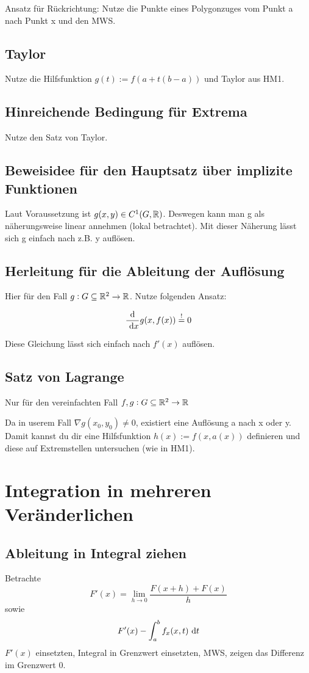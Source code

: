 Ansatz für Rückrichtung: Nutze die Punkte eines Polygonzuges vom Punkt a nach
Punkt x und den MWS.

\subsection{Taylor}
Nutze die Hilfsfunktion $g(t):=f(a+t(b-a))$ und Taylor aus HM1.

\subsection{Hinreichende Bedingung für Extrema}
Nutze den Satz von Taylor.

\subsection{Beweisidee für den Hauptsatz über implizite Funktionen}
Laut Voraussetzung ist $g(x,y) \in C^1(G,\mathbb{R})$. Deswegen kann man g als näherungsweise
linear annehmen (lokal betrachtet). Mit dieser Näherung lässt sich g einfach nach
z.B. y auflösen.

\subsection{Herleitung für die Ableitung der Auflösung}
Hier für den Fall $g:G\subseteq \mathbb{R}^{2} \rightarrow \mathbb{R}$. Nutze folgenden Ansatz:

\begin{equation*}
    \frac{\text{d}}{\text{ d}x}g(x,f(x)) \stackrel{!}{=} 0
\end{equation*}

Diese Gleichung lässt sich einfach nach $f'(x)$ auflösen.

\subsection{Satz von Lagrange}
Nur für den vereinfachten Fall $f,g:G \subseteq \mathbb{R}^{2} \rightarrow \mathbb{R}$

Da in userem Fall $\nabla g(x_0,y_0) \neq 0$, existiert eine Auflösung a nach x oder
y. Damit kannst du dir eine Hilfsfunktion $h(x):=f(x,a(x))$ definieren und diese
auf Extremstellen untersuchen (wie in HM1).


 \section{Integration in mehreren Veränderlichen}
 \subsection{Ableitung in Integral ziehen}
 Betrachte
 \begin{equation*}
     F'(x) = \lim_{h \to 0} \frac{F(x + h) + F(x)}{h}
 \end{equation*}
 sowie
 \begin{equation*}
     F'(x) - \int_a^b f_x(x,t) \text{ d}t
 \end{equation*}
 $F'(x)$ einsetzten, Integral in Grenzwert einsetzten, MWS,
 zeigen das Differenz im Grenzwert $0$.

